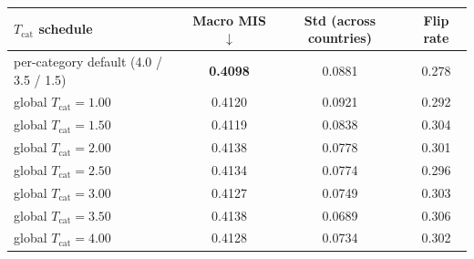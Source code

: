 \begin{tabular}{lccc}\toprule
$T_{\text{cat}}$ schedule & Macro MIS $\downarrow$ & Std (across countries) & Flip rate \\\midrule
per-category default (4.0 / 3.5 / 1.5) & \textbf{0.4098} & 0.0881 & 0.278 \\
\midrule
global $T_\text{cat} = 1.00$ & 0.4120 & 0.0921 & 0.292 \\
global $T_\text{cat} = 1.50$ & 0.4119 & 0.0838 & 0.304 \\
global $T_\text{cat} = 2.00$ & 0.4138 & 0.0778 & 0.301 \\
global $T_\text{cat} = 2.50$ & 0.4134 & 0.0774 & 0.296 \\
global $T_\text{cat} = 3.00$ & 0.4127 & 0.0749 & 0.303 \\
global $T_\text{cat} = 3.50$ & 0.4138 & 0.0689 & 0.306 \\
global $T_\text{cat} = 4.00$ & 0.4128 & 0.0734 & 0.302 \\
\bottomrule
\end{tabular}